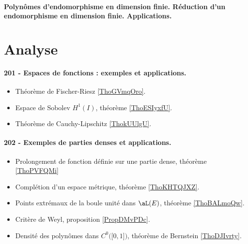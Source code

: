\paragraph{Polynômes d'endomorphisme en dimension finie. Réduction d'un endomorphisme en dimension finie. Applications.}


\section{Analyse}

\paragraph{201 - Espaces de fonctions : exemples et applications.}
\begin{itemize}
    \item Théorème de Fischer-Riesz \ref{ThoGVmqOro}.
    \item Espace de Sobolev \( H^1(I)\), théorème \ref{ThoESIyxfU}.
    \item Théorème de Cauchy-Lipschitz \ref{ThokUUlgU}.
\end{itemize}
\paragraph{202 - Exemples de parties denses et applications.}
\begin{itemize}
    \item Prolongement de fonction définie sur une partie dense, théorème \ref{ThoPVFQMi}
    \item Complétion d'un espace métrique, théorème \ref{ThoKHTQJXZ}.
    \item Points extrémaux de la boule unité dans \( \aL(E)\), théorème \ref{ThoBALmoQw}.
    \item Critère de Weyl, proposition \ref{PropDMvPDc}.
    \item Densité des polynômes dans \( C^0\big( \mathopen[ 0 , 1 \mathclose] \big)\), théorème de Bernstein \ref{ThoDJIvrty}.
\end{itemize}
